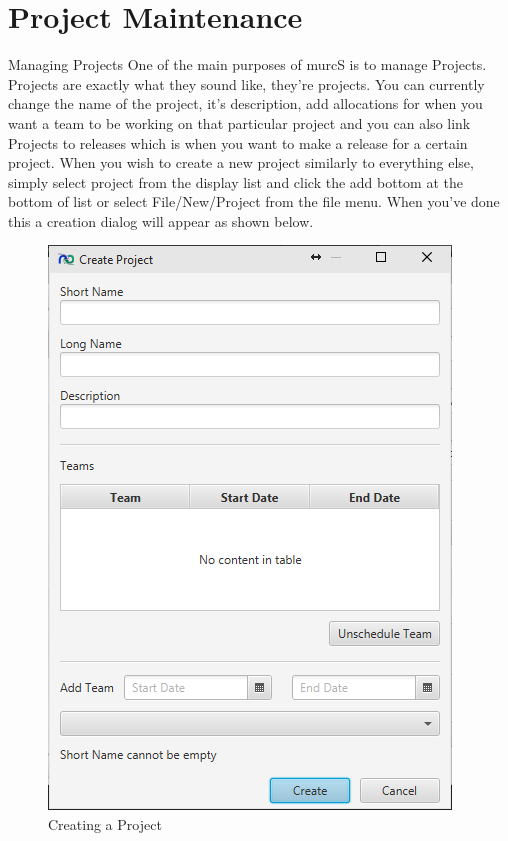 \section{Project Maintenance}

Managing Projects
\newline\newline
One of the main purposes of murcS is to manage Projects. Projects are exactly what they sound like, they're projects. You can currently change the name of the project, it's description, add allocations for when you want a team to be working on that particular project and you can also link Projects to releases which is when you want to make a release for a certain project.
\newline
When you wish to create a new project similarly to everything else, simply select project from the display list and click the add bottom at the bottom of list or select File/New/Project from the file menu. When you've done this a creation dialog will appear as shown below.

\begin{figure}[H]
\centering
\includegraphics[width=\textwidth]{images/screenshots/projects1.PNG}
\caption{Creating a Project}
\label{fig:new_project}
\end{figure}

